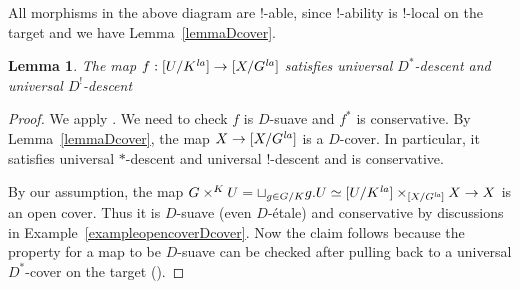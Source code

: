 \documentclass[a4paper,10pt]{amsart}
\theoremstyle{remark}
\theoremstyle{definition}
\theoremstyle{plain}
\newtheorem{lemma}[theorem]{Lemma}
\numberwithin{equation}{section}
\newcommand{\la}{{\it la}}
\begin{document}
All morphisms in the above diagram are $!$-able, since $!$-ability is $!$-local on the target and we have Lemma~\ref{lemmaDcover}. 

\begin{lemma}\label{lemmaDcoverUX}
	The map $f: [U/K^{\la}]\to [X/G^{\la}]$ satisfies universal $D^*$-descent and universal $D^!$-descent
\end{lemma}
\begin{proof}
	We apply \cite[Lem.~4.7.1]{heyer20246functor}. We need to check $f$ is $D$-suave \cite[Def.~4.5.1]{heyer20246functor} and $f^*$ is conservative. By Lemma~\ref{lemmaDcover}, the map $X\to [X/G^{\la}]$ is a $D$-cover. In particular, it satisfies universal $*$-descent and universal $!$-descent and is conservative.
	
	By our assumption, the map $G\times^KU=\sqcup_{g\in G/K} g.U\simeq [U/K^{\la}]\times_{[X/G^{\la}]} X\to X$ is an open cover. Thus it is $D$-suave (even $D$-\'etale) and conservative by discussions in Example~\ref{exampleopencoverDcover}. Now the claim follows because the property for a map to be $D$-suave can be checked after pulling back to a universal $D^*$-cover on the target (\cite[Lemma 4.5.7]{heyer20246functor}).
\end{proof}
\end{document}
